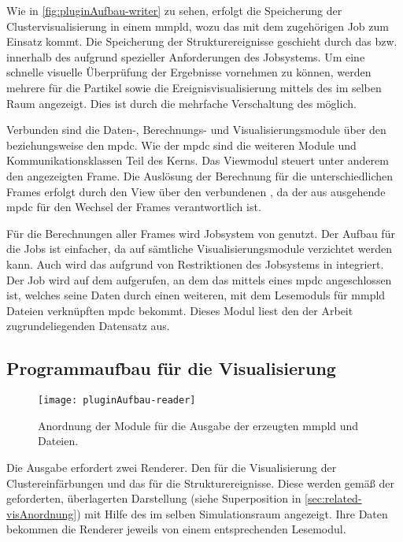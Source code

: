 Wie in \autoref{fig:pluginAufbau-writer} zu sehen, erfolgt die Speicherung der Clustervisualisierung in einem \gls{mmpld}, wozu das  mit dem zugehörigen Job zum Einsatz kommt. Die Speicherung der Strukturereignisse geschieht durch das  bzw. innerhalb des \SECalc aufgrund spezieller Anforderungen des  Jobsystems. Um eine schnelle visuelle Überprüfung der Ergebnisse vornehmen zu können, werden mehrere  für die Partikel sowie die Ereignisvisualisierung mittels des  im selben Raum angezeigt. Dies ist durch die mehrfache Verschaltung des  möglich.

Verbunden sind die Daten-, Berechnungs- und Visualisierungsmodule über den \SEDC beziehungsweise den \gls{mpdc}. Wie der \gls{mpdc} sind die weiteren Module und Kommunikationsklassen Teil des  Kerns. Das Viewmodul steuert unter anderem den angezeigten Frame. Die Auslösung der Berechnung für die unterschiedlichen Frames erfolgt durch den View über den verbundenen , da der aus \SECalc ausgehende \gls{mpdc} für den Wechsel der Frames verantwortlich ist.

Für die Berechnungen aller Frames wird Jobsystem von  genutzt. Der Aufbau für die Jobs ist einfacher, da auf sämtliche Visualisierungsmodule verzichtet werden kann. Auch wird das  aufgrund von Restriktionen des Jobsystems in \SECalc integriert. Der Job wird auf dem  aufgerufen, an dem das \SECalc mittels eines \gls{mpdc} angeschlossen ist, welches seine Daten durch einen weiteren, mit dem Lesemoduls für \gls{mmpld} Dateien verknüpften \gls{mpdc} bekommt. Dieses Modul liest den der Arbeit zugrundeliegenden Datensatz aus.

\subsection*{Programmaufbau für die Visualisierung}\label{sec:pluginaufbau-vis}
\begin{figure}
	\texttt{[image: pluginAufbau-reader]}
	\caption{Anordnung der  Module für die Ausgabe der erzeugten \gls{mmpld} und \MMSE Dateien.}\label{fig:pluginAufbau-reader}
\end{figure}

Die Ausgabe erfordert zwei Renderer. Den  für die Visualisierung der Clustereinfärbungen und das  für die Strukturereignisse. Diese werden gemäß der geforderten, überlagerten Darstellung (siehe Superposition in \autoref{sec:related-visAnordnung}) mit Hilfe des  im selben Simulationsraum angezeigt. Ihre Daten bekommen die Renderer jeweils von einem entsprechenden Lesemodul. 

